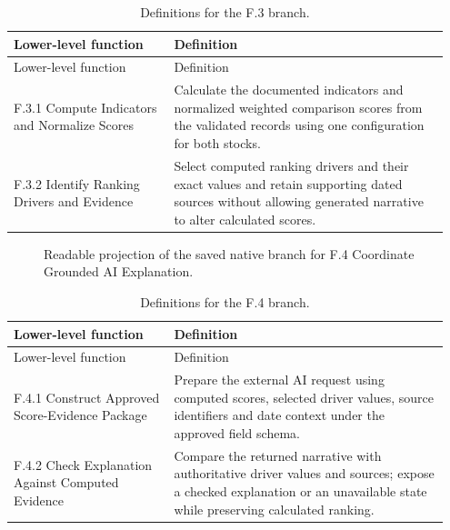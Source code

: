 \documentclass[11pt,letterpaper]{article}
\begin{document}
\begin{longtable}{@{}>{\raggedright\arraybackslash}p{0.35\linewidth}>{\raggedright\arraybackslash}p{0.6\linewidth}@{}}
\caption{Definitions for the F.3 branch.}\\
\toprule Lower-level function & Definition\\\midrule\endfirsthead
\toprule Lower-level function & Definition\\\midrule\endhead
F.3.1 Compute Indicators and Normalize Scores & Calculate the documented indicators and normalized weighted comparison scores from the validated records using one configuration for both stocks.\\[5pt]
F.3.2 Identify Ranking Drivers and Evidence & Select computed ranking drivers and their exact values and retain supporting dated sources without allowing generated narrative to alter calculated scores.\\[5pt]
\bottomrule\end{longtable}
\begin{figure}[H]\centering
{}
\caption{Readable projection of the saved native branch for F.4 Coordinate Grounded AI Explanation.}\label{fig:branch4}\end{figure}
\begin{longtable}{@{}>{\raggedright\arraybackslash}p{0.35\linewidth}>{\raggedright\arraybackslash}p{0.6\linewidth}@{}}
\caption{Definitions for the F.4 branch.}\\
\toprule Lower-level function & Definition\\\midrule\endfirsthead
\toprule Lower-level function & Definition\\\midrule\endhead
F.4.1 Construct Approved Score-Evidence Package & Prepare the external AI request using computed scores, selected driver values, source identifiers and date context under the approved field schema.\\[5pt]
F.4.2 Check Explanation Against Computed Evidence & Compare the returned narrative with authoritative driver values and sources; expose a checked explanation or an unavailable state while preserving calculated ranking.\\[5pt]
\bottomrule\end{longtable}
\end{document}
